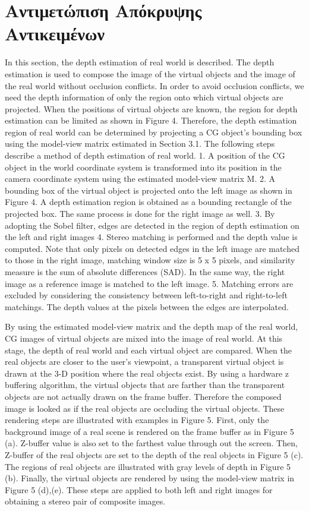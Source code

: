 \section{Αντιμετώπιση Απόκρυψης Αντικειμένων} \label{s:occlusion}

In this section, the depth estimation of real world is described.
The depth estimation is used to compose the image
of the virtual objects and the image of the real world without
occlusion conflicts. In order to avoid occlusion conflicts, we
need the depth information of only the region onto which
virtual objects are projected. When the positions of virtual
objects are known, the region for depth estimation can be
limited as shown in Figure 4. Therefore, the depth estimation
region of real world can be determined by projecting
a CG object’s bounding box using the model-view matrix
estimated in Section 3.1. The following steps describe a
method of depth estimation of real world.
1. A position of the CG object in the world coordinate
system is transformed into its position in the camera
coordinate system using the estimated model-view matrix
M.
2. A bounding box of the virtual object is projected onto
the left image as shown in Figure 4. A depth estimation
region is obtained as a bounding rectangle of the
projected box. The same process is done for the right
image as well.
3. By adopting the Sobel filter, edges are detected in the
region of depth estimation on the left and right images
4. Stereo matching is performed and the depth value is
computed. Note that only pixels on detected edges in
the left image are matched to those in the right image,
matching window size is 5 x 5 pixels, and similarity
measure is the sum of absolute differences (SAD). In
the same way, the right image as a reference image is
matched to the left image.
5. Matching errors are excluded by considering the consistency
between left-to-right and right-to-left matchings.
The depth values at the pixels between the edges
are interpolated.

By using the estimated model-view matrix and the depth
map of the real world, CG images of virtual objects are
mixed into the image of real world. At this stage, the depth
of real world and each virtual object are compared. When
the real objects are closer to the user’s viewpoint, a transparent
virtual object is drawn at the 3-D position where the
real objects exist. By using a hardware z buffering algorithm,
the virtual objects that are farther than the transparent
objects are not actually drawn on the frame buffer. Therefore
the composed image is looked as if the real objects are
occluding the virtual objects. These rendering steps are illustrated
with examples in Figure 5.
First, only the background image of a real scene is rendered
on the frame buffer as in Figure 5 (a). Z-buffer value
is also set to the farthest value through out the screen. Then,
Z-buffer of the real objects are set to the depth of the real
objects in Figure 5 (c). The regions of real objects are illustrated
with gray levels of depth in Figure 5 (b). Finally, the
virtual objects are rendered by using the model-view matrix
in Figure 5 (d),(e). These steps are applied to both left and right images for obtaining a stereo pair of composite
images.

